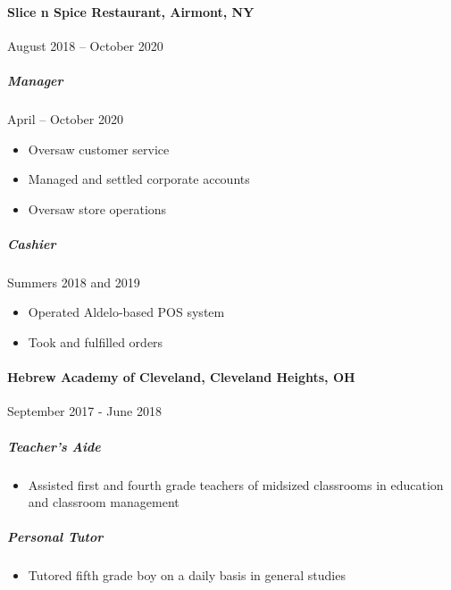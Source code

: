 \documentclass[10pt]{article}
\begin{document}
\paragraph*{Slice n Spice Restaurant, Airmont, NY} \hfill August 2018 – October 2020
\subparagraph*{Manager} \hfill April – October 2020
\begin{itemize}
    \item Oversaw customer service
    \item Managed and settled corporate accounts
    \item Oversaw store operations
\end{itemize}
\subparagraph*{Cashier} \hfill Summers 2018 and 2019
\begin{itemize}
    \item Operated Aldelo-based POS system
    \item Took and fulfilled orders
\end{itemize}

\paragraph*{Hebrew Academy of Cleveland, Cleveland Heights, OH} \hfill  September 2017 - June 2018
\subparagraph*{Teacher's Aide}
\begin{itemize}
    \item  Assisted first and fourth grade teachers of midsized classrooms in education and classroom management
\end{itemize}
\subparagraph*{Personal Tutor}
\begin{itemize}
    \item Tutored fifth grade boy on a daily basis in general studies
\end{itemize}



\end{document}
